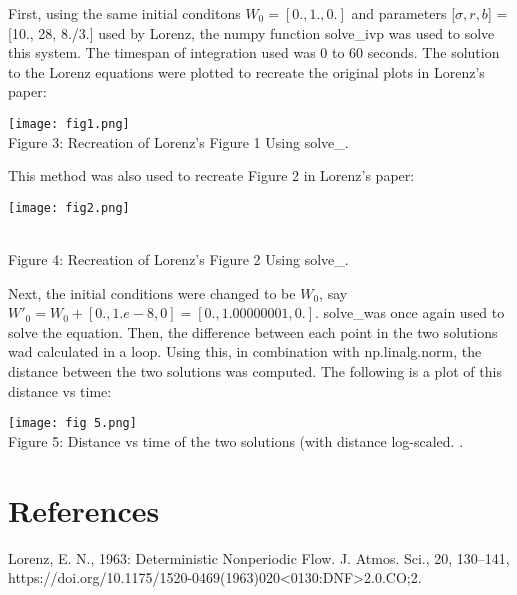 \documentclass{article}
\begin{document}
\hfill \break

First, using the same initial conditons $W_0=[0., 1., 0.]$ and parameters [$\sigma, r, b$] = [10., 28, 8./3.] used by Lorenz, the numpy function  solve\_ivp was used to solve this system. The timespan of integration used was 0 to 60 seconds. The solution to the Lorenz equations were plotted to recreate the original plots in Lorenz's paper: 

\begin{center}
\texttt{[image: fig1.png]}
\\\caption{Figure 3: Recreation of Lorenz's Figure 1 Using solve_\ivp .}
  \label{fig:fig3}
  

\hfill \break

This method was also used to recreate Figure 2 in Lorenz's paper:

\texttt{[image: fig2.png]}

\\\caption{Figure 4: Recreation of Lorenz's Figure 2 Using solve_\ivp .}
  \label{fig:fig2}
  
\end{center}
\hfill \break



Next, the initial conditions were changed to be $W_0$, say $W'_0 = W_0+[0., 1.e-8, 0] = [0., 1.00000001, 0.]$. solve_\ivp was once again used to solve the equation. Then, the difference between each point in the two solutions wad calculated in a loop. Using this, in combination with np.linalg.norm,  the distance between the two solutions was computed. The following is a plot of this distance vs time: 


\texttt{[image: fig 5.png]}
\\\caption{Figure 5: Distance vs time of the two solutions (with distance log-scaled.  .}
  \label{fig:fig5}

\section{References}
Lorenz, E. N., 1963: Deterministic Nonperiodic Flow. J. Atmos. Sci., 20, 130–141, https://doi.org/10.1175/1520-0469(1963)020<0130:DNF>2.0.CO;2.
\end{document}
